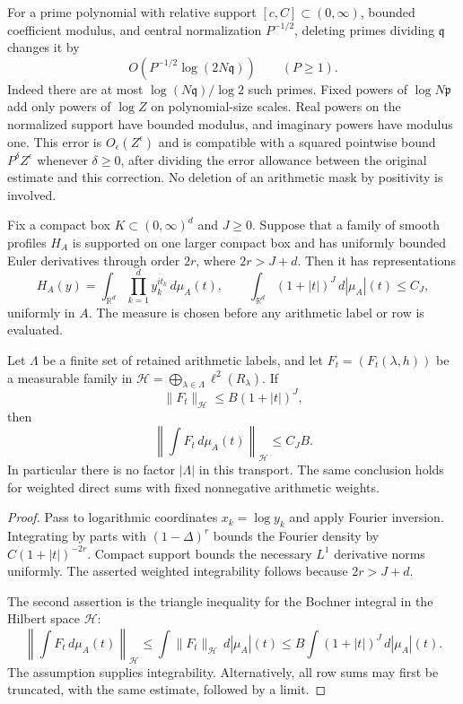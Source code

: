 For a prime polynomial with relative support $[c,C]\subset(0,\infty)$,
bounded coefficient modulus, and central normalization $P^{-1/2}$,
deleting primes dividing $\mathfrak q$ changes it by
\[
 O(P^{-1/2}\log(2N\mathfrak q))\qquad(P\geq1).
\]
Indeed there are at most $\log(N\mathfrak q)/\log2$ such primes.
Fixed powers of $\log N\mathfrak p$ add only powers of $\log Z$ on
polynomial-size scales. Real powers on the normalized support have
bounded modulus, and imaginary powers have modulus one. This error is
$O_\epsilon(Z^\epsilon)$ and is compatible with a squared pointwise
bound $P^\delta Z^\epsilon$ whenever $\delta\geq0$, after dividing
the error allowance between the original estimate and this correction.
No deletion of an arithmetic mask by positivity is involved.

\begin{proposition}
Fix a compact box $K\subset(0,\infty)^d$ and $J\geq0$. Suppose that
a family of smooth profiles $H_A$ is supported on one larger compact
box and has uniformly bounded Euler derivatives through order $2r$,
where $2r>J+d$. Then it has representations
\[
 H_A(y)=\int_{\mathbb R^d}\prod_{k=1}^d y_k^{it_k}\,d\mu_A(t),
 \qquad
 \int_{\mathbb R^d}(1+|t|)^J\,d|\mu_A|(t)\leq C_J,
\]
uniformly in $A$. The measure is chosen before any arithmetic label
or row is evaluated.

Let $\Lambda$ be a finite set of retained arithmetic labels, and let
$F_t=(F_t(\lambda,h))$ be a measurable family in
$\mathcal H=\bigoplus_{\lambda\in\Lambda}\ell^2(R_\lambda)$.
If
\[
 \|F_t\|_{\mathcal H}\leq B(1+|t|)^J,
\]
then
\[
 \left\|\int F_t\,d\mu_A(t)\right\|_{\mathcal H}
       \leq C_J B.
\]
In particular there is no factor $|\Lambda|$ in this transport.
The same conclusion holds for weighted direct sums with fixed
nonnegative arithmetic weights.
\end{proposition}
\begin{proof}
Pass to logarithmic coordinates $x_k=\log y_k$ and apply Fourier
inversion. Integrating by parts with $(1-\Delta)^r$ bounds the
Fourier density by $C(1+|t|)^{-2r}$. Compact support bounds the
necessary $L^1$ derivative norms uniformly. The asserted weighted
integrability follows because $2r>J+d$.

The second assertion is the triangle inequality for the Bochner
integral in the Hilbert space $\mathcal H$:
\[
 \left\|\int F_t\,d\mu_A(t)\right\|_{\mathcal H}
 \leq\int\|F_t\|_{\mathcal H}\,d|\mu_A|(t)
 \leq B\int(1+|t|)^J\,d|\mu_A|(t).
\]
The assumption supplies integrability. Alternatively, all row sums
may first be truncated, with the same estimate, followed by a limit.
\end{proof}

